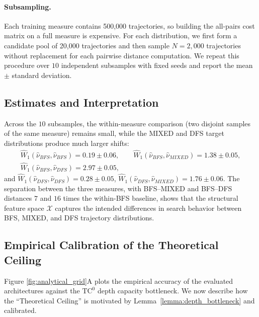\paragraph{Subsampling.}
Each training measure contains 500,000 trajectories, so building the all-pairs cost matrix on a full measure is expensive. 
For each distribution, we first form a candidate pool of 20,000 trajectories and then sample $N=2{,}000$ trajectories without replacement for each pairwise distance computation. 
We repeat this procedure over $10$ independent subsamples with fixed seeds and report the mean $\pm$ standard deviation.

\subsection{Estimates and Interpretation}

 
Across the $10$ subsamples, the within-measure comparison (two disjoint samples of the same measure) remains small, while the MIXED and DFS target distributions produce much larger shifts:
\begin{gather*}
\widehat W_{1}(\hat{\nu}_{BFS},\hat{\nu}_{BFS}) = 0.19 \pm 0.06,\qquad
\widehat W_{1}(\hat{\nu}_{BFS},\hat{\nu}_{MIXED}) = 1.38 \pm 0.05,\\
\widehat W_{1}(\hat{\nu}_{BFS},\hat{\nu}_{DFS}) = 2.97 \pm 0.05,
\end{gather*}
and $\widehat W_{1}(\hat{\nu}_{DFS},\hat{\nu}_{DFS}) = 0.28 \pm 0.05$, $\widehat W_{1}(\hat{\nu}_{DFS},\hat{\nu}_{MIXED}) = 1.76 \pm 0.06$.
The separation between the three measures, with BFS--MIXED and BFS--DFS distances $7$ and $16$ times the within-BFS baseline, shows that the structural feature space $\mathcal{X}$ captures the intended differences in search behavior between BFS, MIXED, and DFS trajectory distributions.

\subsection{Empirical Calibration of the Theoretical Ceiling}
\label{app:empirical_calibration}

Figure \ref{fig:analytical_grid}A plots the empirical accuracy of the evaluated architectures against the $\text{TC}^0$ depth capacity bottleneck. We now describe how the ``Theoretical Ceiling'' is motivated by Lemma~\ref{lemma:depth_bottleneck} and calibrated. %

